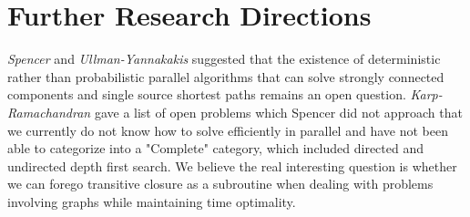 \documentclass[paper=a4, fontsize=11pt]{scrartcl} %
\numberwithin{equation}{section} %
\numberwithin{figure}{section} %
\numberwithin{table}{section} %
\begin{document}

\section{Further Research Directions}
\textit{Spencer\cite{S97}} and \textit{Ullman-Yannakakis\cite{UY91}} suggested that the existence of deterministic rather than probabilistic parallel algorithms that can solve strongly connected components and single source shortest paths remains an open question. \textit{Karp-Ramachandran\cite{KR90}} gave a list of open problems which Spencer did not approach that we currently do not know how to solve efficiently in parallel and have not been able to categorize into a "Complete" category, which included directed and  undirected depth first search. We believe the real interesting question is whether we can forego transitive closure as a subroutine when dealing with problems involving graphs while maintaining time optimality.






\end{document}
